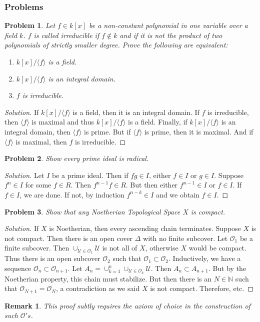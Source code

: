 \documentclass[oneside]{book}
\theoremstyle{mystyle}
\newtheorem{problem}{Problem}[section]
\newtheorem{remark}{Remark}[section]
\begin{document}
\subsubsection{Problems}
\begin{problem}
Let $f\in k[x]$ be a non-constant polynomial in one variable over a field $k$. $f$ is called irreducible if $f\notin k$ and if it is not the product of two polynomials of strictly smaller degree. Prove the following are equivalent:
\begin{enumerate}
    \item $k[x]/\langle f\rangle$ is a field.
    \item $k[x]/\langle f\rangle$ is an integral domain.
    \item $f$ is irreducible.
\end{enumerate}
\end{problem}
\begin{proof}[Solution]
If $k[x]/\langle f\rangle$ is a field, then it is an integral domain. If $f$ is irreducible, then $\langle f\rangle$ is maximal and thus $k[x]/\langle f\rangle$ is a field. Finally, if $k[x]/\langle f\rangle$ is an integral domain, then $\langle f\rangle$ is prime. But if $\langle f\rangle$ is prime, then it is maximal. And if $\langle f\rangle$ is maximal, then $f$ is irreducible. 
\end{proof}
\begin{problem}
Show every prime ideal is radical.
\end{problem}
\begin{proof}[Solution]
Let $I$ be a prime ideal. Then if $fg\in I$, either $f\in I$ or $g\in I$. Suppose $f^n \in I$ for some $f\in R$. Then $f^{n-1}f \in R$. But then either $f^{n-1} \in I$ or $f\in I$. If $f\in I$, we are done. If not, by induction $f^{n-k} \in I$ and we obtain $f\in I$.
\end{proof}
\begin{problem}
Show that any Noetherian Topological Space $X$ is compact.
\end{problem}
\begin{proof}[Solution]
If $X$ is Noetherian, then every ascending chain terminates. Suppose $X$ is not compact. Then there is an open cover $\Delta$ with no finite subcover. Let $\mathcal{O}_1$ be a finite subcover. Then $\cup_{\mathcal{U}\in \mathcal{O}_1} \mathcal{U}$ is not all of $X$, otherwise $X$ would be compact. Thus there is an open subcover $\mathcal{O}_2$ such that $\mathcal{O}_1 \subset \mathcal{O}_2$. Inductively, we have a sequence $\mathcal{O}_n\subset \mathcal{O}_{n+1}$. Let $A_n = \cup_{k=1}^{n} \cup_{\mathcal{U}\in \mathcal{O}_k}\mathcal{U}$. Then $A_{n}\subset A_{n+1}$. But by the Noetherian property, this chain must stabilize. But then there is an $N\in \mathbb{N}$ such that $\mathcal{O}_{N+1} = \mathcal{O}_N$, a contradiction as we said $X$ is not compact. Therefore, etc.
\end{proof}
\begin{remark}
This proof subtly requires the axiom of choice in the construction of such $\mathcal{O}'s$.
\end{remark}
\end{document}
